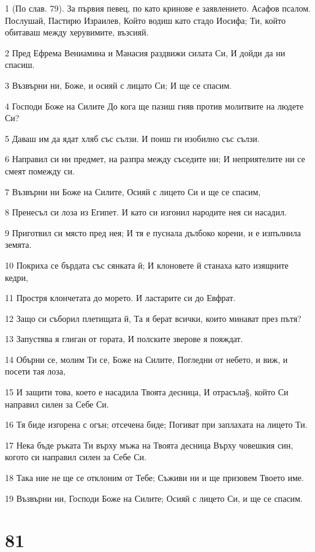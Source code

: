 \par 1 (По слав. 79). За първия певец, по като кринове е заявлението. Асафов псалом. Послушай, Пастирю Израилев, Който водиш като стадо Иосифа; Ти, който обитаваш между херувимите, възсияй.
\par 2 Пред Ефрема Вениамина и Манасия раздвижи силата Си, И дойди да ни спасиш.
\par 3 Възвърни ни, Боже, и осияй с лицато Си; И ще се спасим.
\par 4 Господи Боже на Силите До кога ще пазиш гняв против молитвите на людете Си?
\par 5 Даваш им да ядат хляб със сълзи. И поиш ги изобилно със сълзи.
\par 6 Направил си ни предмет, на разпра между съседите ни; И неприятелите ни се смеят помежду си.
\par 7 Възвърни ни Боже на Силите, Осияй с лицето Си и ще се спасим,
\par 8 Пренесъл си лоза из Египет. И като си изгонил народите нея си насадил.
\par 9 Приготвил си място пред нея; И тя е пуснала дълбоко корени, и е изпълнила земята.
\par 10 Покриха се бърдата със сянката й; И клоновете й станаха като изящните кедри,
\par 11 Простря клончетата до морето. И ластарите си до Евфрат.
\par 12 Защо си съборил плетищата й, Та я берат всички, които минават през пътя?
\par 13 Запустява я глиган от гората, И полските зверове я пояждат.
\par 14 Обърни се, молим Ти се, Боже на Силите, Погледни от небето, и виж, и посети тая лоза,
\par 15 И защити това, което е насадила Твоята десница, И отрасъла§, който Си направил силен за Себе Си.
\par 16 Тя биде изгорена с огън; отсечена биде; Погиват при заплахата на лицето Ти.
\par 17 Нека бъде ръката Ти върху мъжа на Твоята десница Върху човешкия син, когото си направил силен за Себе Си.
\par 18 Така ние не ще се отклоним от Тебе; Съживи ни и ще призовем Твоето име.
\par 19 Възвърни ни, Господи Боже на Силите; Осияй с лицето Си, и ще се спасим.

\chapter{81}

